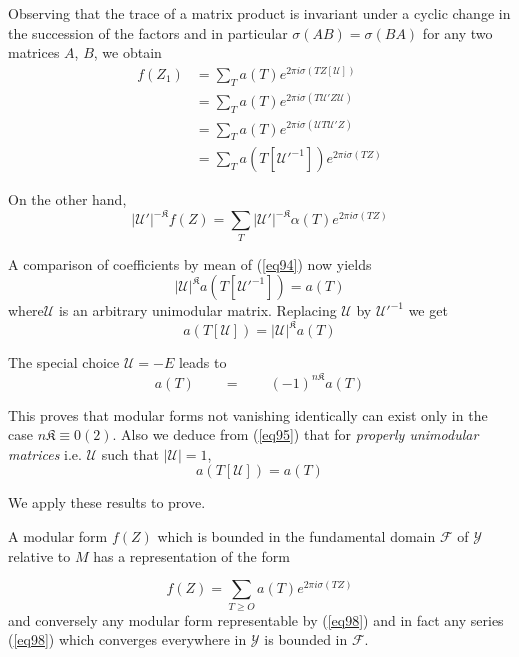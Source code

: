 Observing that the trace of a matrix product is invariant under a
cyclic change in the succession of the factors and in particular
$\sigma (AB)=\sigma (BA)$ for any two matrices $A$, $B$, we obtain  
\begin{align*}
f(Z_1) & = \sum_T a (T)e^{2 \pi i \sigma (TZ[\mathcal{U}])}\\
&=\sum_T a (T)e^{2 \pi i \sigma (T \mathcal{U'}Z \mathcal{U})}\\
&=\sum_T a (T)e^{2 \pi i \sigma ( \mathcal{U} T  \mathcal{U'} Z)}\\
&=\sum_T a (T[\mathcal{U'}^{-1}]) e^{2\pi i \sigma (TZ)}
\end{align*}

On the other hand,
$$
|\mathcal{U'}|^{- \mathfrak{K}}f(Z)= \sum_T |\mathcal{U'}|^{-
  \mathfrak{K}} \alpha (T) e^{2\pi i \sigma (TZ)} 
$$

A comparison of coefficients by mean of (\ref{eq94}) now yields
$$
|\mathcal{U}|^\mathfrak{K}a (T[\mathcal{U'}^{-1}])= a (T)
$$
where\pageoriginale $\mathcal{U}$ is an arbitrary unimodular matrix. Replacing
$\mathcal{U}$ by $\mathcal{U}'^{-1}$ we get 
\begin{equation*}
a (T[\mathcal{U}])= |\mathcal{U}|^\mathfrak{K} a (T) \tag{95}\label{eq95}
\end{equation*}

The special choice $\mathcal{U}=-E$ leads to 
\begin{equation*}
a(T) \qquad = \qquad (-1)^{n \mathfrak{K}} a (T) \tag{96}\label{eq96}
\end{equation*}

This proves that modular forms not vanishing identically can exist
only in the case $n \mathfrak{K}\equiv 0(2)$. Also we deduce from
(\ref{eq95}) that for \textit{properly unimodular matrices}
i.e. $\mathcal{U}$ such that $|\mathcal{U}|=1$, 
\begin{equation*}
a (T[\mathcal{U}])= a (T) \tag{97}\label{eq97}
\end{equation*}

We apply these results to prove.

\begin{lem}\label{chap5:lem10}%
A modular form $f(Z)$ which is bounded in the fundamental domain
  $\mathcal{F}$ of $\mathscr{Y}$ relative to $M$ has a representation
  of the form  
\end{lem}
\begin{equation*}
f(Z)= \sum _{T \ge O} a (T)e^{2 \pi i \sigma (TZ)} \tag{98}\label{eq98}
\end{equation*}
and conversely any modular form representable by (\ref{eq98}) and in fact
any series (\ref{eq98}) which converges everywhere in $\mathscr{Y}$ is
bounded in $\mathcal{F}$. 

